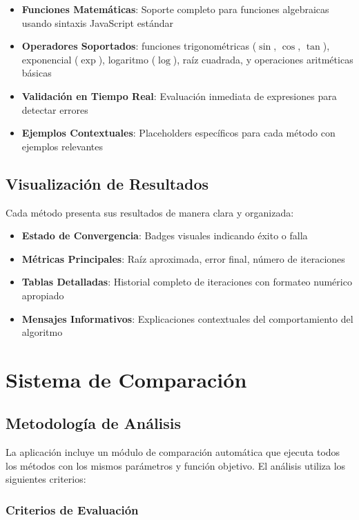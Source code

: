 \begin{itemize}
    \item \textbf{Funciones Matemáticas}: Soporte completo para funciones algebraicas usando sintaxis JavaScript estándar
    \item \textbf{Operadores Soportados}: funciones trigonométricas ($\sin$, $\cos$, $\tan$), exponencial ($\exp$), logaritmo ($\log$), raíz cuadrada, y operaciones aritméticas básicas
    \item \textbf{Validación en Tiempo Real}: Evaluación inmediata de expresiones para detectar errores
    \item \textbf{Ejemplos Contextuales}: Placeholders específicos para cada método con ejemplos relevantes
\end{itemize}

\subsection{Visualización de Resultados}

Cada método presenta sus resultados de manera clara y organizada:

\begin{itemize}
    \item \textbf{Estado de Convergencia}: Badges visuales indicando éxito o falla
    \item \textbf{Métricas Principales}: Raíz aproximada, error final, número de iteraciones
    \item \textbf{Tablas Detalladas}: Historial completo de iteraciones con formateo numérico apropiado
    \item \textbf{Mensajes Informativos}: Explicaciones contextuales del comportamiento del algoritmo
\end{itemize}

\section{Sistema de Comparación}

\subsection{Metodología de Análisis}

La aplicación incluye un módulo de comparación automática que ejecuta todos los métodos con los mismos parámetros y función objetivo. El análisis utiliza los siguientes criterios:

\subsubsection{Criterios de Evaluación}

